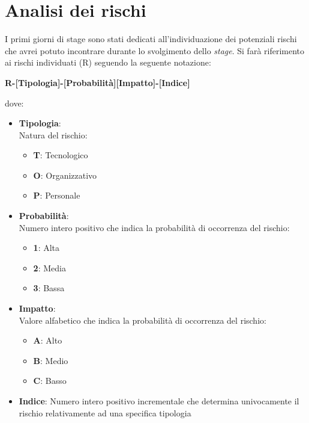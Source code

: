 \section{Analisi dei rischi}
I primi giorni di stage sono stati dedicati all'individuazione dei potenziali rischi che avrei potuto incontrare durante lo svolgimento dello \textit{stage}.
Si farà riferimento ai rischi individuati (R) seguendo la seguente notazione: 
\begin{center}
    \textbf{R-[Tipologia]-[Probabilità][Impatto]-[Indice]}
\end{center}
dove:
\begin{itemize}
    \item \textbf{Tipologia}: \\ Natura del rischio: \begin{itemize}
        \item \textbf{T}: Tecnologico
        \item \textbf{O}: Organizzativo
        \item \textbf{P}: Personale
    \end{itemize}
    \item \textbf{Probabilità}: \\ Numero intero positivo che indica la probabilità di occorrenza del rischio: \begin{itemize}
        \item \textbf{1}: Alta
        \item \textbf{2}: Media
        \item \textbf{3}: Bassa
    \end{itemize}
    \item \textbf{Impatto}: \\ Valore alfabetico che indica la probabilità di occorrenza del rischio: \begin{itemize}
        \item \textbf{A}: Alto
        \item \textbf{B}: Medio
        \item \textbf{C}: Basso
    \end{itemize}
    \item \textbf{Indice}: Numero intero positivo incrementale che determina univocamente il rischio relativamente ad una specifica tipologia
\end{itemize}

